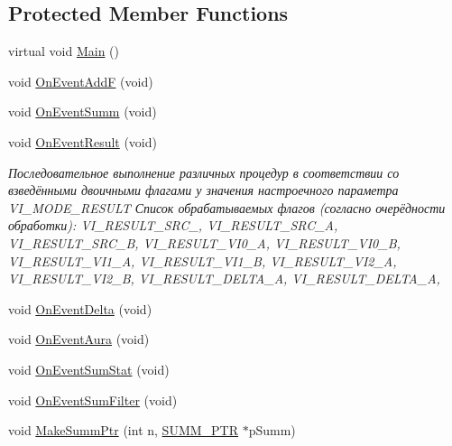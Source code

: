 \subsection*{Protected Member Functions}
\begin{DoxyCompactItemize}
\item 
virtual void \hyperlink{class_c_v_i_engine_thread_a24ed1bd13eea28048ed010e65697e578}{Main} ()
\item 
void \hyperlink{class_c_v_i_engine_thread_aa9882f7bd24457ef387daf9b878d9e36}{On\+Event\+Add\+F} (void)
\item 
void \hyperlink{class_c_v_i_engine_thread_ac41086d9d426c39ce9a5ab78bdff6f8d}{On\+Event\+Summ} (void)
\item 
void \hyperlink{class_c_v_i_engine_thread_a59da3179cc28387c9ebe468cdb33bcb1}{On\+Event\+Result} (void)
\begin{DoxyCompactList}\small\item\em Последовательное выполнение различных процедур в соответствии со взведёнными двоичными флагами у значения настроечного параметра V\+I\+\_\+\+M\+O\+D\+E\+\_\+\+R\+E\+S\+U\+L\+T Список обрабатываемых флагов (согласно очерёдности обработки)\+: V\+I\+\_\+\+R\+E\+S\+U\+L\+T\+\_\+\+S\+R\+C\+\_, V\+I\+\_\+\+R\+E\+S\+U\+L\+T\+\_\+\+S\+R\+C\+\_\+\+A, V\+I\+\_\+\+R\+E\+S\+U\+L\+T\+\_\+\+S\+R\+C\+\_\+\+B, V\+I\+\_\+\+R\+E\+S\+U\+L\+T\+\_\+\+V\+I0\+\_\+\+A, V\+I\+\_\+\+R\+E\+S\+U\+L\+T\+\_\+\+V\+I0\+\_\+\+B, V\+I\+\_\+\+R\+E\+S\+U\+L\+T\+\_\+\+V\+I1\+\_\+\+A, V\+I\+\_\+\+R\+E\+S\+U\+L\+T\+\_\+\+V\+I1\+\_\+\+B, V\+I\+\_\+\+R\+E\+S\+U\+L\+T\+\_\+\+V\+I2\+\_\+\+A, V\+I\+\_\+\+R\+E\+S\+U\+L\+T\+\_\+\+V\+I2\+\_\+\+B, V\+I\+\_\+\+R\+E\+S\+U\+L\+T\+\_\+\+D\+E\+L\+T\+A\+\_\+\+A, V\+I\+\_\+\+R\+E\+S\+U\+L\+T\+\_\+\+D\+E\+L\+T\+A\+\_\+\+A, \end{DoxyCompactList}\item 
void \hyperlink{class_c_v_i_engine_thread_ae5c43326cf2db88c2233f60412113e14}{On\+Event\+Delta} (void)
\item 
void \hyperlink{class_c_v_i_engine_thread_a5631fcb6ffa27a49f369ae01473862a2}{On\+Event\+Aura} (void)
\item 
void \hyperlink{class_c_v_i_engine_thread_ade67a36c8b54ee5bb4fae3dac9871274}{On\+Event\+Sum\+Stat} (void)
\item 
void \hyperlink{class_c_v_i_engine_thread_aa6eb58239fd138860ec06da35715ab9f}{On\+Event\+Sum\+Filter} (void)
\item 
void \hyperlink{class_c_v_i_engine_thread_a6b428d3d881e10a03902dbf16742084e}{Make\+Summ\+Ptr} (int n, \hyperlink{struct_c_v_i_engine_thread_1_1tag_s_u_m_m___p_t_r}{S\+U\+M\+M\+\_\+\+P\+T\+R} $\ast$p\+Summ)
\end{DoxyCompactItemize}
